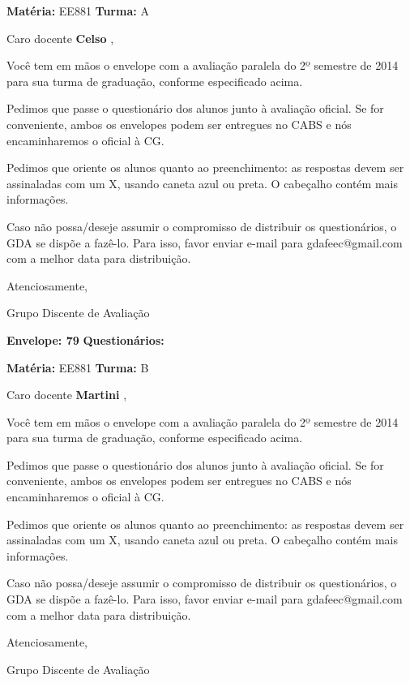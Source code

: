 \documentclass[a5paper]{letter}
\begin{document}
\newpage
\thispagestyle{empty}

\hfill {\bf Matéria:} EE881 {\bf Turma:} A

Caro docente {\bf Celso }, 

	Você tem em mãos o envelope com a avaliação paralela do 2º semestre de 2014 para sua turma de graduação, conforme especificado acima.

	Pedimos que passe o questionário dos alunos junto à avaliação oficial. Se for conveniente, ambos os envelopes podem ser entregues no CABS e nós encaminharemos o oficial à CG.

Pedimos que oriente os alunos quanto ao preenchimento: as respostas devem ser assinaladas com um X, usando caneta azul ou preta. O cabeçalho contém mais informações.

	Caso não possa/deseje assumir o compromisso de distribuir os questionários, o GDA se dispõe a fazê-lo. Para isso, favor enviar e-mail para gdafeec@gmail.com com a melhor data para distribuição.


Atenciosamente, 

Grupo Discente de Avaliação

\vspace{0.5cm}

{\bf Envelope: 79 }		\hfill	{\bf Questionários:} \hspace{2cm}

\newpage
\thispagestyle{empty}

\hfill {\bf Matéria:} EE881 {\bf Turma:} B

Caro docente {\bf Martini }, 

	Você tem em mãos o envelope com a avaliação paralela do 2º semestre de 2014 para sua turma de graduação, conforme especificado acima.

	Pedimos que passe o questionário dos alunos junto à avaliação oficial. Se for conveniente, ambos os envelopes podem ser entregues no CABS e nós encaminharemos o oficial à CG.

Pedimos que oriente os alunos quanto ao preenchimento: as respostas devem ser assinaladas com um X, usando caneta azul ou preta. O cabeçalho contém mais informações.

	Caso não possa/deseje assumir o compromisso de distribuir os questionários, o GDA se dispõe a fazê-lo. Para isso, favor enviar e-mail para gdafeec@gmail.com com a melhor data para distribuição.


Atenciosamente, 

Grupo Discente de Avaliação
\end{document}

